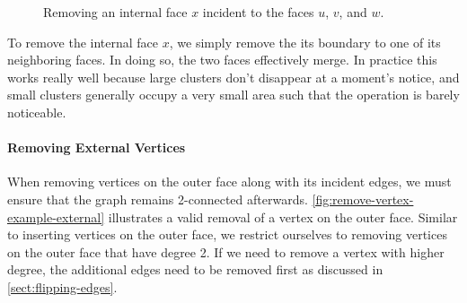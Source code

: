\begin{figure}[H]
	\centering
	\quad
	\caption{Removing an internal face $x$ incident to the faces $u$, $v$, and $w$.}
	\label{fig:remove-vertex-illustration}
\end{figure}

To remove the internal face $x$, we simply remove the its boundary to one of its neighboring faces. In doing so, the two faces effectively merge. In practice this works really well because large clusters don't disappear at a moment's notice, and small clusters generally occupy a very small area such that the operation is barely noticeable.




\paragraph{Removing External Vertices}

When removing vertices on the outer face along with its incident edges, we must ensure that the graph remains 2-connected afterwards. \cref{fig:remove-vertex-example-external} illustrates a valid removal of a vertex on the outer face. Similar to inserting vertices on the outer face, we restrict ourselves to removing vertices on the outer face that have degree 2. If we need to remove a vertex with higher degree, the additional edges need to be removed first as discussed in \cref{sect:flipping-edges}.

